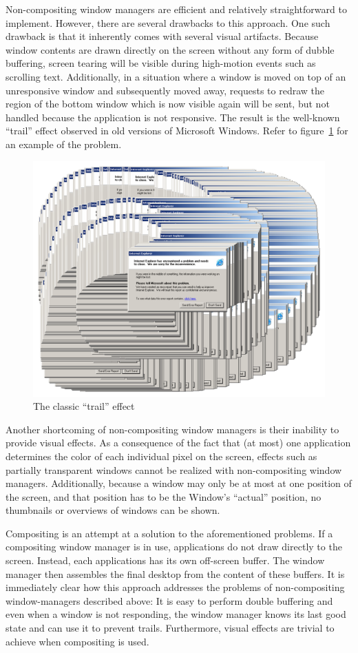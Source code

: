 \documentclass[10pt,twocolumn,a4paper,os=win]{article}
\begin{document}
			Non-compositing window managers are efficient and relatively
			straightforward to implement. However, there are several drawbacks
			to this approach.  One such drawback is that it inherently comes
			with several visual artifacts. Because window contents are drawn
			directly on the screen without any form of dubble buffering, screen
			tearing will be visible during high-motion events such as scrolling
			text. Additionally, in a situation where a window is moved on top
			of an unresponsive window and subsequently moved away, requests to
			redraw the region of the bottom window which is now visible again
			will be sent, but not handled because the application is not
			responsive. The result is the well-known \enquote{trail} effect
			observed in old versions of Microsoft Windows. Refer to
			figure~\ref{fig:trail} for an example of the problem.
			\begin{figure}[h]
				\centering
				\includegraphics[width=0.8\columnwidth]{trail}
				\caption{The classic \enquote{trail} effect}
				\label{fig:trail}
			\end{figure}

			Another shortcoming of non-compositing window managers is their
			inability to provide visual effects. As a consequence of the fact
			that (at most) one application determines the color of each individual
			pixel on the screen, effects such as partially transparent windows
			cannot be realized with non-compositing window managers. Additionally,
			because a window may only be at most at one position of the screen,
			and that position has to be the Window's \enquote{actual} position,
			no thumbnails or overviews of windows can be shown.

			Compositing is an attempt at a solution to the aforementioned
			problems.  If a compositing window manager is in use, applications
			do not draw directly to the screen. Instead, each applications has
			its own off-screen buffer. The
			window manager then assembles the final
			desktop from the content of these buffers. It is immediately clear how this approach addresses the
			problems of non-compositing window-managers described above: It is
			easy to perform double buffering and even when a window is not
			responding, the window manager knows its last good state and can
			use it to prevent trails. Furthermore, visual effects are trivial
			to achieve when compositing is used. \cite{dwmoverview}
\end{document}
